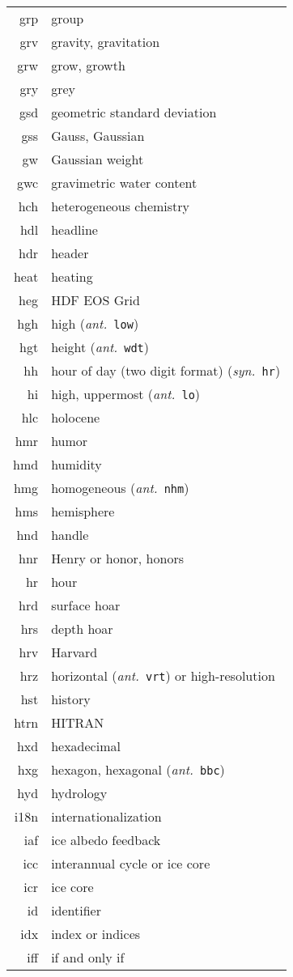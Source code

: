 \documentclass[12pt,twoside]{article}
\newcommand{\ant}[1]{(\textit{ant.}~\texttt{#1})}
\newcommand{\syn}[1]{(\textit{syn.}~\texttt{#1})}
\begin{document}
\begin{longtable}[>{\bfseries}l]{>{\ttfamily}r l}
grp & group \\
grv & gravity, gravitation \\
grw & grow, growth \\
gry & grey \\
gsd & geometric standard deviation \\
gss & Gauss, Gaussian \\
gw & Gaussian weight \\
gwc & gravimetric water content \\
hch & heterogeneous chemistry \\
hdl & headline \\
hdr & header \\
heat & heating \\
heg & HDF EOS Grid \\
hgh & high \ant{low} \\
hgt & height \ant{wdt} \\
hh & hour of day (two digit format) \syn{hr} \\
hi & high, uppermost \ant{lo} \\
hlc & holocene \\
hmr & humor \\
hmd & humidity \\
hmg & homogeneous \ant{nhm} \\
hms & hemisphere \\
hnd & handle \\
hnr & Henry or honor, honors \\
hr & hour \\
hrd & surface hoar \\
hrs & depth hoar \\
hrv & Harvard \\
hrz & horizontal \ant{vrt} or high-resolution \\
hst & history \\
htrn & HITRAN \\
hxd & hexadecimal \\
hxg & hexagon, hexagonal \ant{bbc} \\
hyd & hydrology \\
i18n & internationalization \\
iaf & ice albedo feedback \\
icc & interannual cycle or ice core \\
icr & ice core \\
id & identifier \\
idx & index or indices \\
iff & if and only if \\

\end{longtable}
\end{document}
